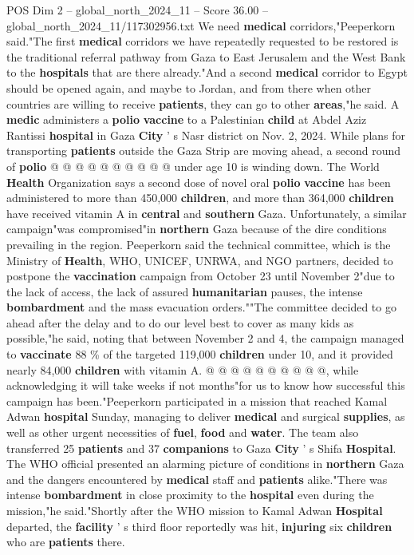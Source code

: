 \begin{textsample}{POS Dim 2 – global\_north\_2024\_11 – Score 36.00 – global\_north\_2024\_11/117302956.txt}
We need \textbf{medical} corridors,"Peeperkorn said."The first \textbf{medical} corridors we have repeatedly requested to be restored is the traditional referral pathway from Gaza to East Jerusalem and the West Bank to the \textbf{hospitals} that are there already."And a second \textbf{medical} corridor to Egypt should be opened again, and maybe to Jordan, and from there when other countries are willing to receive \textbf{patients}, they can go to other \textbf{areas},"he said.
A \textbf{medic} administers a \textbf{polio} \textbf{vaccine} to a Palestinian \textbf{child} at Abdel Aziz Rantissi \textbf{hospital} in Gaza \textbf{City} ' s Nasr district on Nov. 2, 2024.
While plans for transporting \textbf{patients} outside the Gaza Strip are moving ahead, a second round of \textbf{polio} @ @ @ @ @ @ @ @ @ @ under age 10 is winding down.
The World \textbf{Health} Organization says a second dose of novel oral \textbf{polio} \textbf{vaccine} has been administered to more than 450,000 \textbf{children}, and more than 364,000 \textbf{children} have received vitamin A in \textbf{central} and \textbf{southern} Gaza.
Unfortunately, a similar campaign"was compromised"in \textbf{northern} Gaza because of the dire conditions prevailing in the region.
Peeperkorn said the technical committee, which is the Ministry of \textbf{Health}, WHO, UNICEF, UNRWA, and NGO partners, decided to postpone the \textbf{vaccination} campaign from October 23 until November 2"due to the lack of access, the lack of assured \textbf{humanitarian} pauses, the intense \textbf{bombardment} and the mass evacuation orders.""The committee decided to go ahead after the delay and to do our level best to cover as many kids as possible,"he said, noting that between November 2 and 4, the campaign managed to \textbf{vaccinate} 88 \% of the targeted 119,000 \textbf{children} under 10, and it provided nearly 84,000 \textbf{children} with vitamin A. @ @ @ @ @ @ @ @ @ @, while acknowledging it will take weeks if not months"for us to know how successful this campaign has been."Peeperkorn participated in a mission that reached Kamal Adwan \textbf{hospital} Sunday, managing to deliver \textbf{medical} and surgical \textbf{supplies}, as well as other urgent necessities of \textbf{fuel}, \textbf{food} and \textbf{water}.
The team also transferred 25 \textbf{patients} and 37 \textbf{companions} to Gaza \textbf{City} ' s Shifa \textbf{Hospital}.
The WHO official presented an alarming picture of conditions in \textbf{northern} Gaza and the dangers encountered by \textbf{medical} staff and \textbf{patients} alike."There was intense \textbf{bombardment} in close proximity to the \textbf{hospital} even during the mission,"he said."Shortly after the WHO mission to Kamal Adwan \textbf{Hospital} departed, the \textbf{facility} ' s third floor reportedly was hit, \textbf{injuring} six \textbf{children} who are \textbf{patients} there.

\end{textsample}
